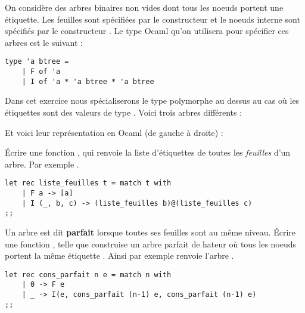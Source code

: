 \documentclass{report}
\begin{document}
\begin{exo}[Arbres]
    On considère des arbres binaires non vides dont tous les noeuds portent une
    étiquette. Les feuilles sont spécifiées par le constructeur  et le
    noeuds interne sont spécifiés par le constructeur . Le type Ocaml qu'on
    utilisera pour spécifier ces arbres est le suivant :
    \begin{lstlisting}
type 'a btree =
    | F of 'a
    | I of 'a * 'a btree * 'a btree\end{lstlisting}
    Dans cet exercice nous spécialiserons le type polymorphe au dessus au cas où
    les étiquettes sont des valeurs de type . Voici trois arbres
    différents :

    Et voici leur représentation en Ocaml (de gauche à droite) :
    \begin{enumerate}
        \itt {}
        \itt {}
        \itt {}
    \end{enumerate}
    \begin{q}{1}
        Écrire une fonction , qui renvoie
        la liste d'étiquettes de toutes les \textit{feuilles} d'un arbre. Par exemple
        .
        \begin{lstlisting}
let rec liste_feuilles t = match t with
    | F a -> [a]
    | I (_, b, c) -> (liste_feuilles b)@(liste_feuilles c)
;;      \end{lstlisting}
    \end{q}
    \begin{q}{2}
        Un arbre est dit \textbf{parfait} lorsque toutes ses feuilles sont au même
        niveau. Écrire une fonction ,
        telle que  construise un arbre parfait de
        hateur  où tous les noeuds portent la même étiquette .
        Ainsi par exemple  renvoie l'arbre .
        \begin{lstlisting}
let rec cons_parfait n e = match n with
    | 0 -> F e
    | _ -> I(e, cons_parfait (n-1) e, cons_parfait (n-1) e)
;;      \end{lstlisting}
    \end{q}
    \begin{q}{3}

\end{q}
\end{exo}
\end{document}
